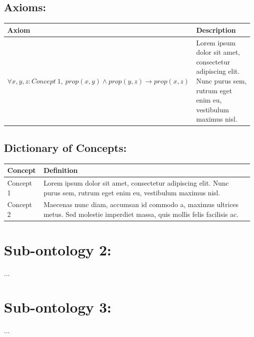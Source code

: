 \documentclass[table,usenames,dvipsnames]{article}
\begin{document}
\subsection{Axioms:}
\label{sec-sub1-axioms}

\begin{center}
	\begin{small}
		\begin{longtable}{ p{80mm} p{80mm} }
			\hline
			\textbf{Axiom} & \textbf{Description} \\\hline
			
			$\forall x,y,z:Concept\ 1,\ prop(x, y) \wedge prop(y, z) \rightarrow prop(x, z)$
				& Lorem ipsum dolor sit amet, consectetur adipiscing elit. Nunc purus sem, rutrum eget enim eu, vestibulum maximus nisl.
				\\\hline
		\end{longtable}
	\end{small}
\end{center}


\subsection{Dictionary of Concepts:}
\label{sec-sub1-axioms}

\begin{center}
	\begin{small}
		\begin{longtable}{ p{30mm} p{130mm} }
			\hline
			\textbf{Concept} & \textbf{Definition} \\\hline
			
			Concept 1
				& Lorem ipsum dolor sit amet, consectetur adipiscing elit. Nunc purus sem, rutrum eget enim eu, vestibulum maximus nisl.
				\\\hline
			
			Concept 2
				& Maecenas nunc diam, accumsan id commodo a, maximus ultrices metus. Sed molestie imperdiet massa, quis mollis felis facilisis ac.
				\\\hline
		\end{longtable}
	\end{small}
\end{center}



\section{Sub-ontology 2:}
\label{sec-sub2}

...



\section{Sub-ontology 3:}
\label{sec-sub3}

...




\end{document}
